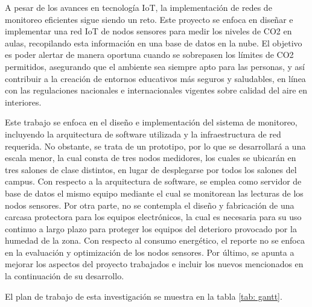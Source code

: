 A pesar de los avances en tecnología IoT, la implementación de redes de monitoreo eficientes sigue siendo un reto. Este proyecto se enfoca en diseñar e implementar una red IoT de nodos sensores para medir los niveles de CO2 en aulas, recopilando esta información en una base de datos en la nube. El objetivo es poder alertar de manera oportuna cuando se sobrepasen los límites de CO2 permitidos, asegurando que el ambiente sea siempre apto para las personas, y así contribuir a la creación de entornos educativos más seguros y saludables, en línea con las regulaciones nacionales e internacionales vigentes sobre calidad del aire en interiores.



Este trabajo se enfoca en el diseño e implementación del sistema de monitoreo, incluyendo la arquitectura de software utilizada y la infraestructura de red requerida. No obstante, se trata de un prototipo, por lo que se desarrollará a una escala menor, la cual consta de tres nodos medidores, los cuales se ubicarán en tres salones de clase distintos, en lugar de desplegarse por todos los salones del campus. Con respecto a la arquitectura de software, se emplea como servidor de base de datos el mismo equipo mediante el cual se monitorean las lecturas de los nodos sensores. Por otra parte, no se contempla el diseño y fabricación de una carcasa protectora para los equipos electrónicos, la cual es necesaria para su uso continuo a largo plazo para proteger los equipos del deterioro provocado por la humedad de la zona. Con respecto al consumo energético, el reporte no se enfoca en la evaluación y optimización de los nodos sensores. Por último, se apunta a mejorar los aspectos del proyecto trabajados e incluir los nuevos mencionados en la continuación de su desarrollo.

El plan de trabajo de esta investigación se muestra en la tabla \ref{tab: gantt}.


